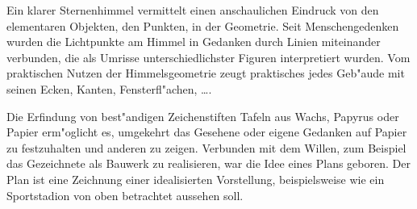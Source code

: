 \begin{MIntro}

Ein klarer Sternenhimmel vermittelt einen anschaulichen Eindruck von den 
elementaren Objekten, den Punkten, in der Geometrie. Seit Menschengedenken
wurden die Lichtpunkte am Himmel in Gedanken durch Linien miteinander 
verbunden, die als Umrisse unterschiedlichster Figuren interpretiert wurden.
Vom praktischen Nutzen der Himmelsgeometrie zeugt praktisches jedes Geb"aude
mit seinen Ecken, Kanten, Fensterfl"achen, \ldots.

Die Erfindung von best"andigen Zeichenstiften Tafeln aus Wachs, Papyrus oder 
Papier erm"oglicht es, umgekehrt das Gesehene oder eigene Gedanken {\glqq}auf
Papier{\grqq} zu festzuhalten und anderen zu zeigen. Verbunden mit dem Willen,
zum Beispiel das Gezeichnete als Bauwerk zu realisieren, war die Idee eines
Plans geboren. Der Plan ist eine Zeichnung einer idealisierten Vorstellung, 
beispielsweise wie ein Sportstadion von oben betrachtet aussehen soll.


\end{MIntro}
